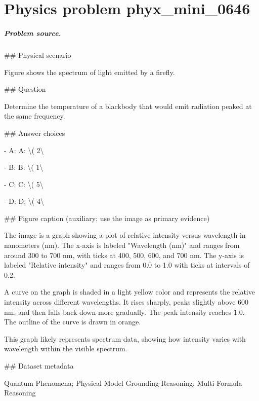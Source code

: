 
\chapter{Physics problem phyx\_mini\_0646}
\label{ch:PhyXMiniProblems_problem_phyx_mini_0646}

\paragraph{Problem source.}
\#\# Physical scenario

Figure shows the spectrum of light emitted by a firefly.

\#\# Question

Determine the temperature of a blackbody that would emit radiation peaked at the same frequency.

\#\# Answer choices

- A: A: \textbackslash{}( 2\textbackslash{}

- B: B: \textbackslash{}( 1\textbackslash{}

- C: C: \textbackslash{}( 5\textbackslash{}

- D: D: \textbackslash{}( 4\textbackslash{}

\#\# Figure caption (auxiliary; use the image as primary evidence)

The image is a graph showing a plot of relative intensity versus wavelength in nanometers (nm). The x-axis is labeled "Wavelength (nm)" and ranges from around 300 to 700 nm, with ticks at 400, 500, 600, and 700 nm. The y-axis is labeled "Relative intensity" and ranges from 0.0 to 1.0 with ticks at intervals of 0.2. 

A curve on the graph is shaded in a light yellow color and represents the relative intensity across different wavelengths. It rises sharply, peaks slightly above 600 nm, and then falls back down more gradually. The peak intensity reaches 1.0. The outline of the curve is drawn in orange. 

This graph likely represents spectrum data, showing how intensity varies with wavelength within the visible spectrum.

\#\# Dataset metadata

Quantum Phenomena; Physical Model Grounding Reasoning, Multi-Formula Reasoning

